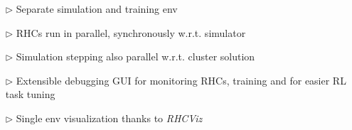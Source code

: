 \begin{Large}
\begin{figure}[h]
	\end{figure}
	\vskip0.5cm
	\begin{itemize}
		\item[$\rhd$] Separate simulation and training env\vskip0.3cm
		\item[$\rhd$] RHCs run in parallel, synchronously w.r.t. simulator\vskip0.3cm
		\item[$\rhd$] Simulation stepping also parallel w.r.t. cluster solution\vskip0.3cm
		\item[$\rhd$] Extensible debugging GUI for monitoring RHCs, training and for easier RL task tuning\vskip0.3cm
		\item[$\rhd$] Single env visualization thanks to \textit{RHCViz}\vskip0.3cm
	\end{itemize}
	\vskip0.5cm
\end{Large}